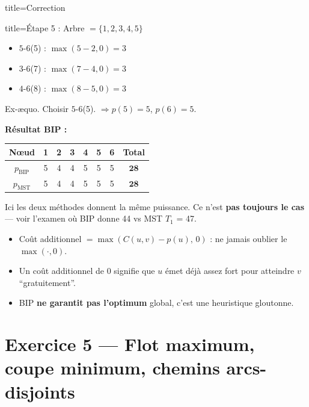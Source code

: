 \documentclass[12pt,a4paper]{article}
\begin{document}
\begin{correction}{title=Correction}
\begin{etape}{title=\'Etape 5 : Arbre $= \{1,2,3,4,5\}$}
\begin{itemize}[nosep]
    \item $5$-$6$(5) : $\max(5-2,0) = 3$
    \item $3$-$6$(7) : $\max(7-4,0) = 3$
    \item $4$-$6$(8) : $\max(8-5,0) = 3$
\end{itemize}
Ex-\ae quo. Choisir $5$-$6$(5). $\Rightarrow p(5)=5$, $p(6)=5$.
\end{etape}

\medskip
\textbf{R\'esultat BIP :}

\begin{center}
\renewcommand{\arraystretch}{1.3}
\begin{tabular}{|c|c|c|c|c|c|c||c|}
\hline
\textbf{N\oe ud} & 1 & 2 & 3 & 4 & 5 & 6 & \textbf{Total} \\\hline
$p_{\text{BIP}}$ & 5 & 4 & 4 & 5 & 5 & 5 & $\mathbf{28}$ \\\hline
$p_{\text{MST}}$ & 5 & 4 & 4 & 5 & 5 & 5 & $\mathbf{28}$ \\\hline
\end{tabular}
\end{center}

Ici les deux m\'ethodes donnent la m\^eme puissance. Ce n'est \textbf{pas toujours le cas} --- voir l'examen o\`u BIP donne 44 vs MST $T_1$ = 47.
\end{correction}

\begin{attention}
\begin{itemize}
    \item Co\^ut additionnel $= \max(C(u,v) - p(u),\, 0)$ : ne jamais oublier le $\max(\cdot, 0)$.
    \item Un co\^ut additionnel de $0$ signifie que $u$ \'emet d\'ej\`a assez fort pour atteindre $v$ ``gratuitement''.
    \item BIP \textbf{ne garantit pas l'optimum} global, c'est une heuristique gloutonne.
\end{itemize}
\end{attention}


\newpage
\section{Exercice 5 --- Flot maximum, coupe minimum, chemins arcs-disjoints}
\end{document}
